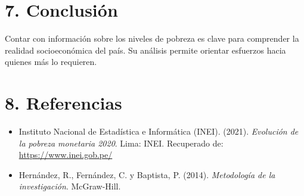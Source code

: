 \documentclass[12pt]{article}
\begin{document}
\section*{7. Conclusi\'on}
Contar con información sobre los niveles de pobreza es clave para comprender la realidad socioeconómica del país. Su análisis permite orientar esfuerzos hacia quienes más lo requieren.

\section*{8. Referencias}
\begin{itemize}
  \item Instituto Nacional de Estadística e Informática (INEI). (2021). \textit{Evolución de la pobreza monetaria 2020}. Lima: INEI. Recuperado de: \url{https://www.inei.gob.pe/}
  \item Hernández, R., Fernández, C. y Baptista, P. (2014). \textit{Metodología de la investigación}. McGraw-Hill.
\end{itemize}
\end{document}
